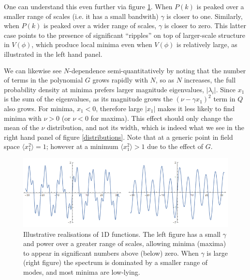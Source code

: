 \documentclass[12pt]{article}
\begin{document}
One can understand this even further via figure \ref{examples1}. When $P(k)$ is peaked over a smaller range of scales (i.e. it has a small bandwith) $\gamma$ is closer to one. Similarly, when $P(k)$ is peaked over a wider range of scales, $\gamma$ is closer to zero. This latter case points to the presence of significant ``ripples'' on top of larger-scale structure in $V(\phi)$, which produce local minima even when $V(\phi)$ is relatively large, as illustrated in the left hand panel.


We can likewise see $N$-dependence semi-quantitatively by noting that the number of terms in the polynomial $G$ grows rapidly with $N$, so as $N$ increases, the full probability density at minima prefers larger magnitude eigenvalues, $|\lambda_i|$. Since $x_1$ is the sum of the eigenvalues, as its magnitude grows the $(\nu-\gamma x_1)^2$ term in $Q$ also grows. For minima, $x_1<0$, therefore large $|x_1|$ makes it less likely to find minima with $\nu >0$ (or $\nu <0 $ for maxima). This effect should only change the mean of the $\nu$ distribution, and not its width, which is indeed what we see in the right hand panel of figure \ref{distributions}. Note that at a generic point in field space $\langle x_1^2\rangle = 1$; however at a minimum $\langle x_1^2 \rangle >1$ due to the effect of $G$.   


\begin{figure}
  \centering
    \includegraphics[width=\linewidth]{TwoSigmas.png}
  \caption{Illustrative realisations of 1D functions. The left figure has a small $\gamma$ and power over a greater range of scales, allowing minima (maxima) to appear in significant numbers above (below) zero. When $\gamma$ is large (right figure) the spectrum is dominated by a smaller range of modes, and most minima are low-lying.}
  \label{examples1}
\end{figure}
\end{document}
